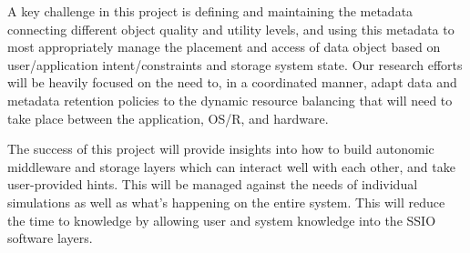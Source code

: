 \documentclass[11pt,letterpaper]{article}
\begin{document}
 
A key challenge in this project is defining and maintaining the metadata
connecting different object quality and utility levels, and using this metadata 
to most appropriately manage the placement and access of data object based on 
user/application intent/constraints and storage system state.
Our research efforts will be heavily focused on the need to, in a
coordinated manner, adapt data and metadata retention policies to the
dynamic resource balancing that will need to take place between the
application, OS/R, and hardware.

The success of this project will provide insights into how to build
autonomic middleware and storage layers which can interact well with each
other, and take user-provided hints.  This will be managed against the needs of
individual simulations as well as what's happening on the entire system. This
will reduce the time to knowledge by allowing user and system knowledge into
the SSIO software layers.




%  
\end{document}
